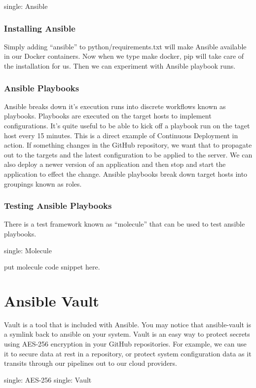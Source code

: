 single: Ansible

\subsubsection{Installing Ansible}
\justify{}
Simply adding ``ansible'' to python/requirements.txt will make Ansible
available in our Docker containers. Now when we type make docker, pip
will take care of the installation for us. Then we can experiment with
Ansible playbook runs.

\subsubsection{Ansible Playbooks}
\justify{}
Ansible breaks down it's execution runs into discrete workflows known as
playbooks. Playbooks are executed on the target hosts to implement
configurations. It's quite useful to be able to kick off a playbook run
on the taget host every 15 minutes. This is a direct example of
Continuous Deployment in action. If something changes in the GitHub
repository, we want that to propagate out to the targets and the latest
configuration to be applied to the server. We can also deploy a newer
version of an application and then stop and start the application to
effect the change.
\justify{}
Ansible playbooks break down target hosts into groupings known as roles.

\subsubsection{Testing Ansible Playbooks}
\justify{}
There is a test framework known as ``molecule'' that can be used to test
ansible playbooks.

single: Molecule

put molecule code snippet here.

\section{Ansible Vault}
\justify{}
Vault is a tool that is included with Ansible. You may notice that
ansible-vault is a symlink back to ansible on your system. Vault is an
easy way to protect secrets using AES-256 encryption in your GitHub
repositories. For example, we can use it to secure data at rest in a
repository, or protect system configuration data as it transits through
our pipelines out to our cloud providers.

single: AES-256 single: Vault

